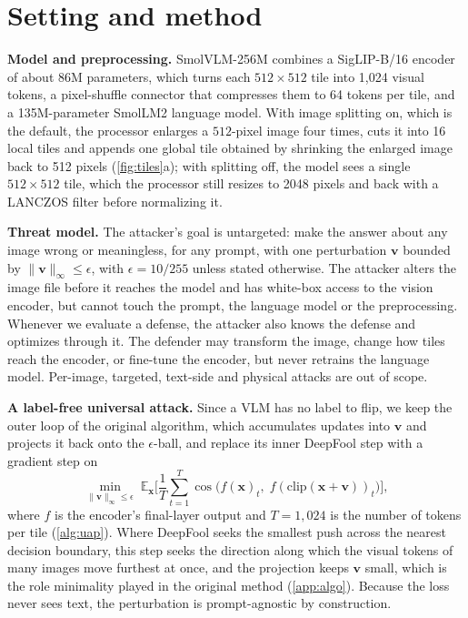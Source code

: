 \documentclass[10pt,twocolumn,letterpaper]{article}
\newcommand{\vv}{\boldsymbol{v}}
\newcommand{\xx}{\boldsymbol{x}}
\begin{document}
\section{Setting and method}
\label{sec:method}

\textbf{Model and preprocessing.} SmolVLM-256M combines a SigLIP-B/16 encoder \cite{zhai2023siglip} of about 86M parameters, which turns each $512\times512$ tile into 1,024 visual tokens, a pixel-shuffle connector that compresses them to 64 tokens per tile, and a 135M-parameter SmolLM2 language model. With image splitting on, which is the default, the processor enlarges a $512$-pixel image four times, cuts it into 16 local tiles and appends one global tile obtained by shrinking the enlarged image back to 512 pixels (\cref{fig:tiles}a); with splitting off, the model sees a single $512\times512$ tile, which the processor still resizes to 2048 pixels and back with a LANCZOS filter before normalizing it.

\textbf{Threat model.} The attacker's goal is untargeted: make the answer about any image wrong or meaningless, for any prompt, with one perturbation $\vv$ bounded by $\|\vv\|_\infty\le\epsilon$, with $\epsilon=10/255$ unless stated otherwise. The attacker alters the image file before it reaches the model and has white-box access to the vision encoder, but cannot touch the prompt, the language model or the preprocessing. Whenever we evaluate a defense, the attacker also knows the defense and optimizes through it. The defender may transform the image, change how tiles reach the encoder, or fine-tune the encoder, but never retrains the language model. Per-image, targeted, text-side and physical attacks are out of scope.

\textbf{A label-free universal attack.} Since a VLM has no label to flip, we keep the outer loop of the original algorithm, which accumulates updates into $\vv$ and projects it back onto the $\epsilon$-ball, and replace its inner DeepFool step with a gradient step on
\begin{equation}
\min_{\|\vv\|_\infty\le\epsilon}\;\mathbb{E}_{\xx}\Big[\frac{1}{T}\sum_{t=1}^{T}\cos\big(f(\xx)_t,\;f(\mathrm{clip}(\xx+\vv))_t\big)\Big],
\label{eq:loss}
\end{equation}
where $f$ is the encoder's final-layer output and $T=1{,}024$ is the number of tokens per tile (\cref{alg:uap}). Where DeepFool seeks the smallest push across the nearest decision boundary, this step seeks the direction along which the visual tokens of many images move furthest at once, and the projection keeps $\vv$ small, which is the role minimality played in the original method (\cref{app:algo}). Because the loss never sees text, the perturbation is prompt-agnostic by construction.
\end{document}
